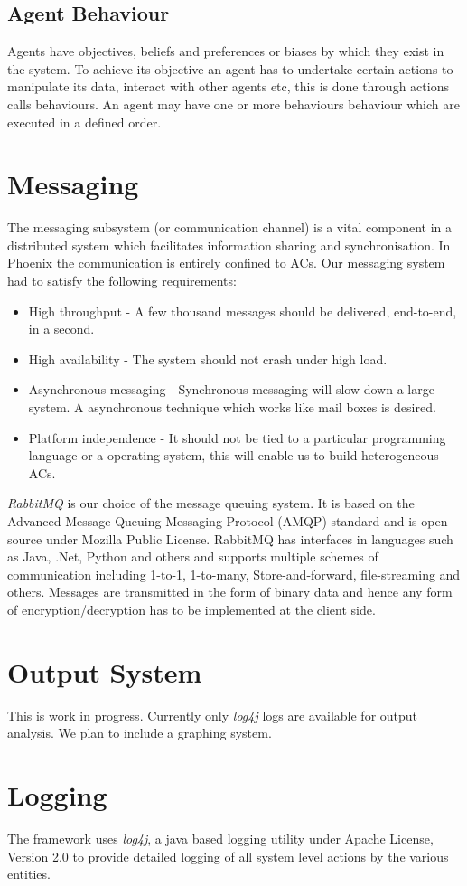 \subsection{ Agent Behaviour }
Agents have objectives, beliefs and preferences or biases by which
they exist in the system. To achieve its objective an agent has to
undertake certain actions to manipulate its data, interact with other
agents etc, this is done through actions calls behaviours. An agent
may have one or more behaviours behaviour which are executed in a
defined order.

\section{ Messaging }
The messaging subsystem (or communication channel) is a vital
component in a distributed system which facilitates information
sharing and synchronisation. In Phoenix the communication is entirely
confined to ACs. Our messaging system had to satisfy the following
requirements:

\begin{itemize}
\item High throughput - A few thousand messages should be delivered,
  end-to-end, in a second.
\item High availability - The system should not crash under high load.
\item Asynchronous messaging - Synchronous messaging will slow down a
  large system. A asynchronous technique which works like mail boxes
  is desired.
\item Platform independence - It should not be tied to a particular
  programming language or a operating system, this will enable us to
  build heterogeneous ACs.
\end{itemize}

\textit{RabbitMQ} is our choice of the message queuing system. It is
based on the Advanced Message Queuing Messaging Protocol (AMQP)
standard and is open source under Mozilla Public License. RabbitMQ has
interfaces in languages such as Java, .Net, Python and others and
supports multiple schemes of communication including 1-to-1,
1-to-many, Store-and-forward, file-streaming and others. Messages are
transmitted in the form of binary data and hence any form of
encryption/decryption has to be implemented at the client side.

\section{ Output System }
This is work in progress. Currently only \textit{log4j} logs are
available for output analysis. We plan to include a graphing system.

\section{ Logging }
The framework uses \textit{log4j}, a java based logging utility under
Apache License, Version 2.0 to provide detailed logging of all system
level actions by the various entities.

